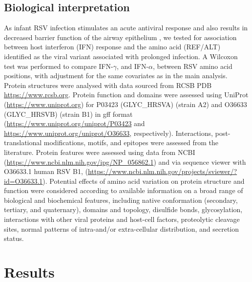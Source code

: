 \documentclass[9pt,lineno]{elife}  %
\begin{document}
\subsection{Biological interpretation}
As infant RSV infection stimulates an acute antiviral response and also results in decreased barrier function of the airway epithelium \citep{connelly2021metabolic}, we tested for association between host interferon (IFN) response and the amino acid (REF/ALT) identified as the viral variant associated with prolonged infection. 
A Wilcoxon test was performed to compare  IFN-$\gamma$, and IFN-$\alpha$, between RSV amino acid positions, with adjustment for the same covariates as in the main analysis. 
Protein structures were analysed with data sourced from RCSB PDB \url{https://www.rcsb.org}. 
Protein function and domains were assessed using UniProt	(\url{https://www.uniprot.org}) for P03423 (GLYC\_HRSVA) (strain A2) and O36633 (GLYC\_HRSVB) (strain B1) in gff format (\url{https://www.uniprot.org/uniprot/P03423} and
\url{https://www.uniprot.org/uniprot/O36633}, respectively). 
Interactions, post-translational modifications, motifs, and epitopes were assessed from the literature. 
Protein features were assessed using data from NCBI (\url{https://www.ncbi.nlm.nih.gov/ipg/NP_056862.1}) and via sequence viewer with O36633.1 human RSV B1, 
(\url{https://www.ncbi.nlm.nih.gov/projects/sviewer/?id=O36633.1}). 
Potential effects of amino acid variation on protein structure and function were considered according to available information on a broad range of biological and biochemical features, including native conformation (secondary, tertiary, and quaternary), domains and topology, disulfide bonds, glycosylation, interactions with other viral proteins and host-cell factors, proteolytic cleavage sites, normal patterns of intra-and/or extra-cellular distribution, and secretion status.

\section{Results}
\end{document}
